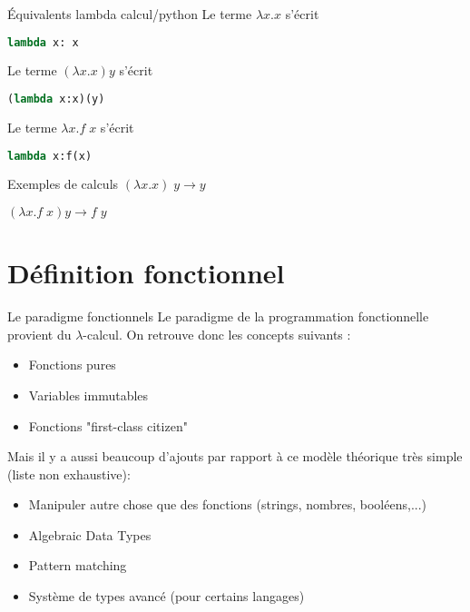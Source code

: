 \documentclass[aspectratio=169]{beamer}
\begin{document}
\begin{frame}[fragile]
    \begin{block}{Équivalents lambda calcul/python}
        Le terme $\lambda x.x$ s'écrit 

        \begin{lstlisting}[language=Python]
lambda x: x          
        \end{lstlisting}
        
        Le terme $(\lambda x.x) y$ s'écrit

        \begin{lstlisting}[language=Python]
(lambda x:x)(y)      
        \end{lstlisting}
    
        Le terme $\lambda x.f\;x$ s'écrit

        \begin{lstlisting}[language=Python]
lambda x:f(x)         
        \end{lstlisting}
    \end{block}

    \begin{block}{Exemples de calculs}
        $(\lambda x.x)\;y \rightarrow y$

        $(\lambda x.f\;x) y \rightarrow f\;y$
    \end{block}

\end{frame}

\section{Définition fonctionnel}

\begin{frame}{Le paradigme fonctionnels}
    Le paradigme de la programmation fonctionnelle provient du $\lambda$-calcul. On retrouve donc les concepts suivants :
    \begin{itemize}
        \item Fonctions pures
        \item Variables immutables
        \item Fonctions "first-class citizen"
    \end{itemize}
    Mais il y a aussi beaucoup d'ajouts par rapport à ce modèle théorique très simple (liste non exhaustive):
    \begin{itemize}
        \item Manipuler autre chose que des fonctions (strings, nombres, booléens,...)
        \item Algebraic Data Types
        \item Pattern matching
        \item Système de types avancé (pour certains langages)
    \end{itemize}
\end{frame}
\end{document}
